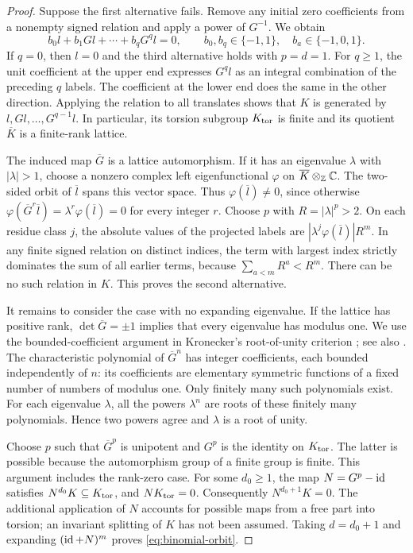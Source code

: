 \begin{proof}
Suppose the first alternative fails. Remove any initial zero coefficients
from a nonempty signed relation and apply a power of $G^{-1}$. We obtain
\[
 b_0l+b_1Gl+\cdots+b_qG^q l=0,
 \qquad b_0,b_q\in\{-1,1\},\quad b_a\in\{-1,0,1\}.
\]
If $q=0$, then $l=0$ and the third alternative holds with $p=d=1$.
For $q\ge1$, the unit coefficient at the upper end expresses $G^ql$
as an integral combination of the preceding $q$ labels. The coefficient
at the lower end does the same in the other direction. Applying the
relation to all translates shows that $K$ is generated by
$l,Gl,\ldots,G^{q-1}l$. In particular, its torsion subgroup $K_{\rm tor}$
is finite and its quotient $\overline K$ is a finite-rank lattice.

The induced map $\overline G$ is a lattice automorphism. If it has an
eigenvalue $\lambda$ with $|\lambda|>1$, choose a nonzero complex left
eigenfunctional $\varphi$ on $\overline K\otimes_\mathbb Z\mathbb C$. The two-sided
orbit of $\overline l$ spans this vector space. Thus
$\varphi(\overline l)\ne0$, since otherwise
$\varphi(\overline G^r\overline l)=\lambda^r
\varphi(\overline l)=0$ for every integer $r$.
Choose $p$ with $R=|\lambda|^p>2$.
On each residue class $j$, the absolute values of the projected labels
are $|\lambda^j\varphi(\overline l)|R^m$. In any finite signed relation
on distinct indices, the term with largest index strictly dominates the
sum of all earlier terms, because $\sum_{a<m}R^a<R^m$.
There can be no such relation in $K$. This proves the second alternative.

It remains to consider the case with no expanding eigenvalue. If the
lattice has positive rank, $\det\overline G=\pm1$ implies that every
eigenvalue has modulus one. We use the bounded-coefficient argument in
Kronecker's root-of-unity criterion \cite[Theorem~I]{Kronecker1857}; see also
\cite[Theorem~1 and its proof]{Damianou2015}.
The characteristic polynomial of
$\overline G^n$ has integer coefficients, each bounded independently of
$n$: its coefficients are elementary symmetric functions of a fixed
number of numbers of modulus one. Only finitely many such polynomials
exist. For each eigenvalue $\lambda$, all the powers $\lambda^n$ are
roots of these finitely many polynomials. Hence two powers agree and
$\lambda$ is a root of unity.

Choose $p$ such that $\overline G^p$ is unipotent and $G^p$ is the
identity on $K_{\rm tor}$. The latter is possible because the automorphism
group of a finite group is finite. This argument includes the rank-zero
case. For some $d_0\ge1$, the map $N=G^p-\operatorname{id}$ satisfies
$N^{d_0}K\subseteq K_{\rm tor}$, and $NK_{\rm tor}=0$.
Consequently $N^{d_0+1}K=0$.
The additional application of $N$ accounts for possible maps from a free
part into torsion; an invariant splitting of $K$ has not been assumed.
Taking $d=d_0+1$ and expanding $(\operatorname{id}+N)^m$ proves
\eqref{eq:binomial-orbit}.
\end{proof}


